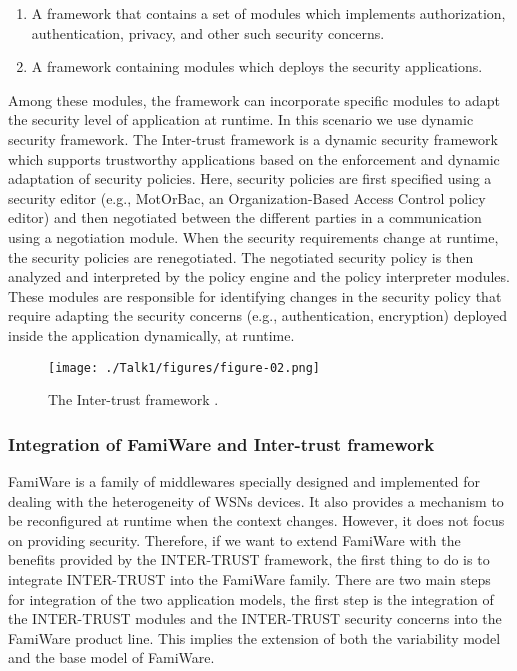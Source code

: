 \documentclass[12pt,a4paper,twoside]{report}
\begin{document}
\begin{enumerate}
	\item  A framework that contains a set of modules which implements authorization, authentication, privacy, and other such security concerns.
	\item A framework containing modules which deploys the security applications.
\end{enumerate}
Among these modules, the framework can incorporate specific modules to adapt the security level of application at runtime. In this scenario we use dynamic security framework.
The Inter-trust framework is a dynamic security framework \cite{ayed;etal:2013} which supports trustworthy applications based on the enforcement and dynamic adaptation of security policies. Here, security policies are first specified using a security editor (e.g., MotOrBac, an Organization-Based Access Control policy editor) and then negotiated between the different parties in a communication using a negotiation module. When the security requirements change at runtime, the security policies are renegotiated. The negotiated security policy is then analyzed and interpreted by the policy engine and the policy interpreter modules. These modules are responsible for identifying changes in the security policy that require adapting the security concerns (e.g., authentication, encryption) deployed inside the application dynamically, at runtime.\par

\begin{figure}[ht]
	\begin{center}
  \texttt{[image: ./Talk1/figures/figure-02.png]}
  \end{center}
  \caption{The Inter-trust framework \cite{ayed;etal:2013}.}
  \label{fig:02}
\end{figure}

\subsubsection{Integration of FamiWare and Inter-trust framework}
FamiWare is a family of middlewares specially designed and implemented for dealing with the heterogeneity of WSNs devices. It also provides a mechanism to be reconfigured at runtime when the context changes. However, it does not focus on providing security. Therefore, if we want to extend FamiWare with the benefits provided by the INTER-TRUST framework, the first thing to do is to integrate INTER-TRUST into the FamiWare family. There are two main steps for integration of the two application models, the first step is the integration of the INTER-TRUST modules and the INTER-TRUST security concerns into the FamiWare product line. This implies the extension of both the variability model and the base model of FamiWare. \par
\end{document}
